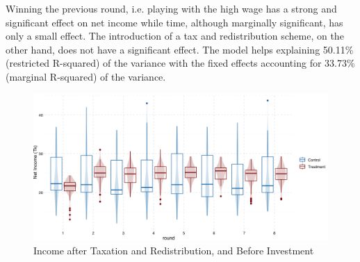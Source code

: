Winning the previous round, i.e. playing with the high wage has a strong and significant effect on net income while time, although marginally significant, has only a small effect. The introduction of a tax and redistribution scheme, on the other hand, does not have a significant effect. The model helps explaining 50.11\% (restricted R-squared) of the variance with the fixed effects accounting for 33.73\% (marginal R-squared) of the variance.\\


\begin{figure}
    \centering
    \includegraphics[width=\textwidth]{graphs/earnings_boxplot.png}
    \caption{Income after Taxation and Redistribution, and Before Investment}
    \label{fig:earnings_boxplot}
\end{figure}



